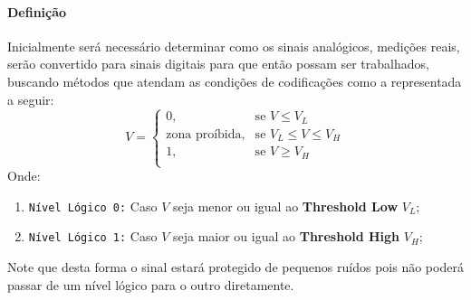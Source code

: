 \documentclass{article}
\begin{document}
                \paragraph{Definição}Inicialmente será necessário determinar como os sinais analógicos, medições reais, serão convertido para sinais digitais para que então possam ser trabalhados, buscando métodos que atendam as condições de codificações como a representada a seguir:
                    \begin{equation}
                        \boxed{
                            V = 
                            \begin{cases}
                                0,                    & \text{se } V \leq V_{L}\\
                                \text{zona proíbida}, & \text{se } V_{L} \leq V \leq V_{H}\\
                                1,                    & \text{se } V \geq V_{H}\\
                            \end{cases}
                        }
                    \end{equation}
                Onde:
                    \begin{enumerate}[noitemsep]
                        \item \texttt{Nível Lógico 0:} Caso $V$ seja menor ou igual ao \textbf{Threshold Low} $V_{L}$;

                        \item \texttt{Nível Lógico 1:} Caso $V$ seja maior ou igual ao \textbf{Threshold High} $V_{H}$;
                    \end{enumerate}
                Note que desta forma o sinal estará protegido de pequenos ruídos pois não poderá passar de um nível lógico para o outro diretamente.

            
\end{document}
